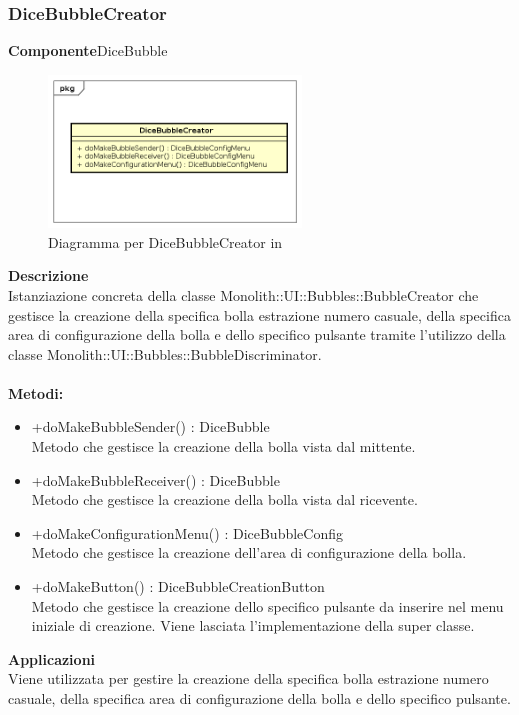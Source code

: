 \subsubsection{DiceBubbleCreator}
\textbf{Componente}DiceBubble\\
   \FloatBarrier
   \begin{figure}[ht]
   \centering
   \includegraphics[width=0.6\textwidth]{img/single-DiceBubbleCreator}
   \caption{{Diagramma per DiceBubbleCreator in }}
\end{figure}
\FloatBarrier
\textbf{Descrizione}\\
Istanziazione concreta della classe Monolith::UI::Bubbles::BubbleCreator che gestisce la creazione della specifica bolla estrazione numero casuale, della specifica area di configurazione della bolla e dello specifico pulsante tramite l'utilizzo della classe Monolith::UI::Bubbles::BubbleDiscriminator.
\\
\\
\textbf{Metodi:} 
\begin{itemize}
\item +doMakeBubbleSender() : DiceBubble 
\\
Metodo che gestisce la creazione della bolla vista dal mittente.
\item +doMakeBubbleReceiver() : DiceBubble 
\\
Metodo che gestisce la creazione della bolla vista dal ricevente.
\item +doMakeConfigurationMenu() : DiceBubbleConfig 
\\
Metodo che gestisce la creazione dell'area di configurazione della bolla.
\item +doMakeButton() : DiceBubbleCreationButton 
\\
Metodo che gestisce la creazione dello specifico pulsante da inserire nel menu iniziale di creazione. Viene lasciata l'implementazione della super classe.
\end{itemize} 


\textbf{Applicazioni}\\
Viene utilizzata per gestire la creazione della specifica bolla estrazione numero casuale, della specifica area di configurazione della bolla e dello specifico pulsante. 



